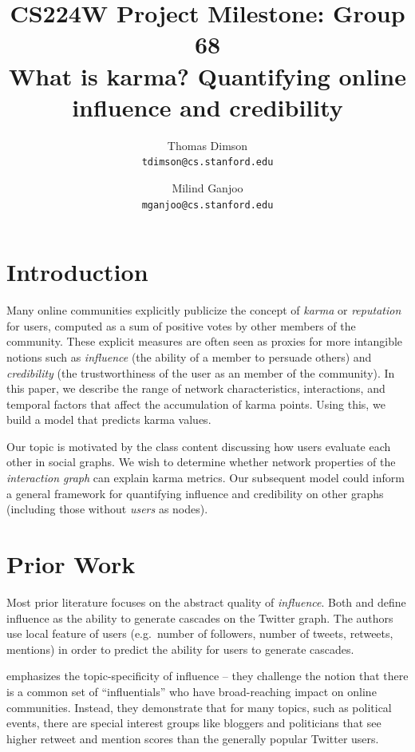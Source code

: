 \documentclass[10pt]{article}
\title{{\large CS224W Project Milestone: Group 68} \\
  What is karma? Quantifying online influence and credibility
}
\author{Thomas Dimson \\ {\tt tdimson@cs.stanford.edu}
  \and
  Milind Ganjoo \\ {\tt mganjoo@cs.stanford.edu}
}
\date{}
\begin{document}
\maketitle

\section{Introduction}

Many online communities explicitly publicize the concept of \textit{karma} or
\textit{reputation} for users, computed as a sum of positive votes by other members of
the community. These explicit measures are often seen as proxies for more
intangible notions such as \textit{influence} (the ability of a member to
persuade others) and \textit{credibility} (the trustworthiness of the user as an
member of the community). In this paper, we describe the range of network
characteristics, interactions, and temporal factors that affect the accumulation
of karma points. Using this, we build a model that predicts karma values.

Our topic is motivated by the class content discussing how users evaluate
each other in social graphs. We wish to determine whether network properties of the 
\textit{interaction graph} can explain karma metrics. Our subsequent model 
could inform a general framework for quantifying influence and credibility
on other graphs (including those without \textit{users} as nodes).

\section{Prior Work}

Most prior literature focuses on the abstract quality of \textit{influence}.
Both \citet{bakshy2011everyone} and \citet{cha2010measuring} define
influence as the ability to generate cascades on the Twitter graph. The authors
use local feature of users (e.g.\ number of followers, number of tweets,
retweets, mentions) in order to predict the ability for users to generate
cascades.

\citet{cha2010measuring} emphasizes the topic-specificity of influence -- they challenge
the notion that there is a common set of ``influentials'' who have
broad-reaching impact on online communities. Instead, they demonstrate that for
many topics, such as political events, there are special interest groups like
bloggers and politicians that see higher retweet and mention scores than the
generally popular Twitter users.
\end{document}
